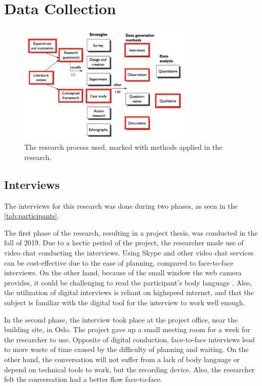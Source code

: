\section{Data Collection}
\begin{figure}
    \begin{center}
        \includegraphics[width=0.75\textwidth]{fig/research_process_master.png}
        \caption{The research process used, marked with methods applied in the research.}
        \label{fig:research_process_master}
    \end{center}
\end{figure}

\subsection*{Interviews}
The interviews for this research was done during two phases, as seen in the \ref{tab:participants}. 

The first phase of the research, resulting in a project thesis, was conducted in the fall of 2019. Due to a hectic period of the project, the researcher made use of video chat conducting the interviews. Using Skype and other video chat services can be cost-effective due to the ease of planning, compared to face-to-face interviews. On the other hand, because of the small window the web camera provides, it could be challenging to read the participant's body language \citep{cater2011skype}.  Also, the utilization of digital interviews is reliant on highspeed internet, and that the subject is familiar with the digital tool for the interview to work well enough.

In the second phase, the interview took place at the project office, near the building site, in Oslo. The project gave up a small meeting room for a week for the researcher to use. Opposite of digital conduction, face-to-face interviews lead to more waste of time caused by the difficulty of planning and waiting. On the other hand, the conversation will not suffer from a lack of body language or depend on technical tools to work, but the recording device. Also, the researcher felt the conversation had a better flow face-to-face. 

